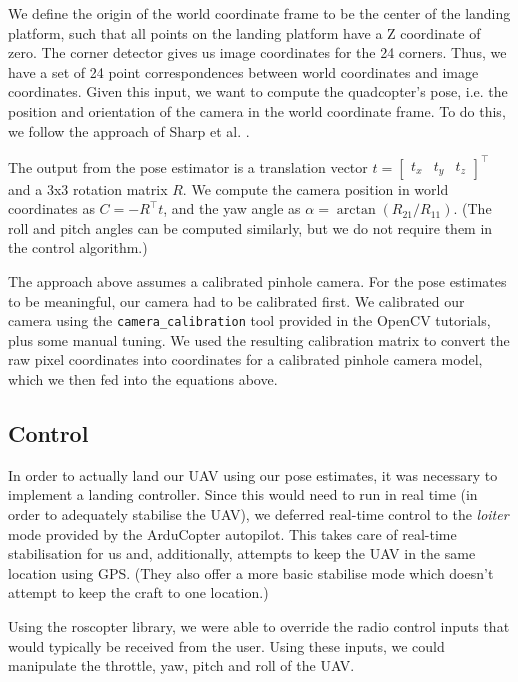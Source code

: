\documentclass[10pt]{scrartcl} %
\begin{document}
We define the origin of the world coordinate frame to be the center of the
landing platform, such that all points on the landing platform have a Z
coordinate of zero. The corner detector gives us image coordinates for the 24
corners. Thus, we have a set of 24 point correspondences between world
coordinates and image coordinates. Given this input, we want to compute the
quadcopter's pose, i.e. the position and orientation of the camera in the world
coordinate frame. To do this, we follow the approach of Sharp et al.
\cite{sharp_et_al_2001}.


The output from the pose estimator is a translation vector
$t = \begin{bmatrix} t_x & t_y & t_z \end{bmatrix}^\top$
and a 3x3 rotation matrix $R$. We compute the camera position in world
coordinates as $C = -R^\top t$, and the yaw angle as
$\alpha = \arctan(R_{21} / R_{11})$. (The roll and pitch angles can be computed
similarly, but we do not require them in the control algorithm.)

The approach above assumes a calibrated pinhole camera. For the pose estimates
to be meaningful, our camera had to be calibrated first. We calibrated our
camera using the {\tt camera\_calibration} tool provided in the OpenCV
tutorials, plus some manual tuning. We used the resulting calibration matrix to
convert the raw pixel coordinates into coordinates for a calibrated pinhole
camera model, which we then fed into the equations above.


\subsection{Control}
In order to actually land our UAV using our pose estimates, it was necessary to implement a landing controller. Since this would need to run in real time (in order to adequately stabilise the UAV), we deferred real-time control to the \textit{loiter} mode provided by the ArduCopter autopilot. This takes care of real-time stabilisation for us and, additionally, attempts to keep the UAV in the same location using GPS. (They also offer a more basic stabilise mode which doesn't attempt to keep the craft to one location.)

Using the roscopter library, we were able to override the radio control inputs that would typically be received from the user. Using these inputs, we could manipulate the throttle, yaw, pitch and roll of the UAV.
\end{document}
